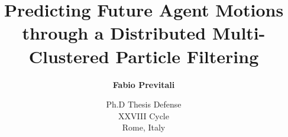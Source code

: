 \documentclass{beamer}
\title[Predicting Future Agent Motions through a Distributed Multi-Clustered PF]{\Large Predicting Future Agent Motions through a Distributed Multi- Clustered Particle Filtering}
\subtitle{}
\author[Fabio Previtali]{\Large\textbf{Fabio Previtali}}
\date[April 14, 2016]{Ph.D Thesis Defense\\XXVIII Cycle\\Rome, Italy}
\begin{document}
\begin{frame}[plain]
	\titlepage
\end{frame}




%
%
%

\tiny


\end{document}
